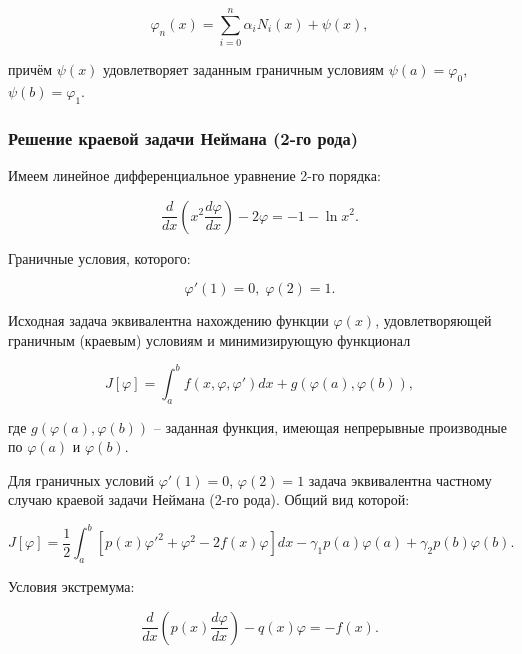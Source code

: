 \documentclass{article}
\begin{document}
\begin{equation}\label{equation_solve_var_rank_2}
	\varphi_{n}(x) = \sum_{i=0}^n \alpha_{i}N_{i}(x) + \psi(x),
\end{equation}

\noindent причём $\psi(x)$ удовлетворяет заданным граничным условиям $\psi(a) = \varphi_{0}$, $\psi(b) = \varphi_{1}$.

\subsubsection{Решение краевой задачи Неймана (2-го рода)}

Имеем линейное дифференциальное уравнение 2-го порядка:

\begin{equation}\label{equation_rang_2}
	\frac{d}{dx}(x^2 \frac{d \varphi}{dx}) - 2\varphi = -1 - \ln{x^2}.
\end{equation}

\noindent Граничные условия, которого:

\begin{displaymath}
	\varphi'(1) = 0, \; \varphi(2) = 1.
\end{displaymath}

Исходная задача эквивалентна нахождению функции $\varphi(x)$, удовлетворяющей граничным (краевым) условиям и минимизирующую функционал

\begin{displaymath}
	J[\varphi] = \int_{a}^{b} f(x, \varphi, \varphi')dx + g(\varphi(a), \varphi(b)),
\end{displaymath}

\noindent где $g(\varphi(a), \varphi(b))$ – заданная функция, имеющая непрерывные производные по $\varphi(a)$ и $\varphi(b)$.

Для граничных условий $\varphi'(1) = 0$, $\varphi(2) = 1$ задача эквивалентна частному случаю краевой задачи Неймана (2-го рода). Общий вид которой:

\begin{displaymath}
	J[\varphi] = \frac{1}{2} \int_{a}^{b} [p(x) \varphi'^2 + \varphi^2 - 2f(x)\varphi]dx - \gamma_{1} p(a) \varphi(a) + \gamma_{2} p(b) \varphi(b).
\end{displaymath}

\noindent Условия экстремума:

\begin{displaymath}
	\frac{d}{dx} (p(x) \frac{d\varphi}{dx}) - q(x)\varphi = -f(x).
\end{displaymath}
\end{document}
